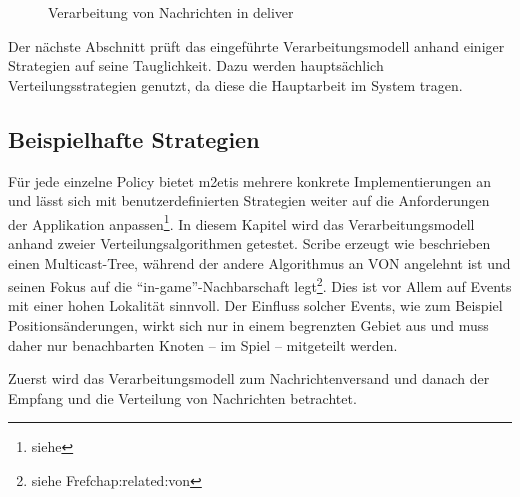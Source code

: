 \begin{figure}[htbp]
\centering
{}
\caption{Verarbeitung von Nachrichten in deliver}
\label{fig:processing_deliver}
\end{figure}

Der nächste Abschnitt prüft das eingeführte Verarbeitungsmodell anhand einiger Strategien auf seine Tauglichkeit. Dazu werden hauptsächlich Verteilungsstrategien genutzt, da diese die Hauptarbeit im System tragen.

\subsection*{Beispielhafte Strategien}
Für jede einzelne Policy bietet \ac{m2etis} mehrere konkrete Implementierungen an und lässt sich mit benutzerdefinierten Strategien weiter auf die Anforderungen der Applikation anpassen\footnote{siehe }. In diesem Kapitel wird das Verarbeitungsmodell anhand zweier Verteilungsalgorithmen getestet. Scribe \cite{Castro2002Scribe} erzeugt wie beschrieben einen Multicast-Tree, während der andere Algorithmus an VON \cite{Hu2006VON} angelehnt ist und seinen Fokus auf die ``in-game''-Nachbarschaft legt\footnote{siehe Fref{chap:related:von}}. Dies ist vor Allem auf Events mit einer hohen Lokalität sinnvoll. Der Einfluss solcher Events, wie zum Beispiel Positionsänderungen, wirkt sich nur in einem begrenzten Gebiet aus und muss daher nur benachbarten Knoten -- im Spiel -- mitgeteilt werden.

Zuerst wird das Verarbeitungsmodell zum Nachrichtenversand und danach der Empfang und die Verteilung von Nachrichten betrachtet.

